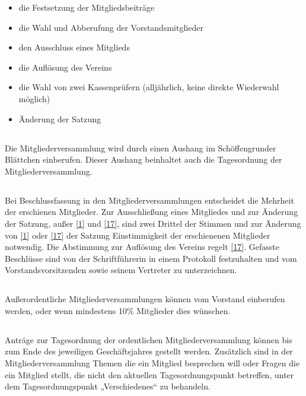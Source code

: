 	\begin{itemize}
		\item die Festsetzung der Mitgliedsbeiträge 
		\item die Wahl und Abberufung der Vorstandsmitglieder
		\item den Ausschluss eines Mitglieds
		\item die Auflösung des Vereins
		\item die Wahl von zwei Kassenprüfern (alljährlich, keine direkte Wiederwahl möglich)
		\item Änderung der Satzung  
	\end{itemize} 

	
	\subsection{} Die Mitgliederversammlung wird durch einen Aushang im Schöffengrunder Blättchen einberufen. Dieser Aushang beinhaltet auch die Tagesordnung der Mitgliederversammlung.  
	
	\subsection{} Bei Beschlussfassung in den Mitgliederversammlungen entscheidet die Mehrheit der erschienen Mitglieder. Zur Ausschließung eines Mitgliedes und zur Änderung der Satzung, außer \ref{1} und \ref{17}, sind zwei Drittel der Stimmen und zur Änderung von \ref{1} oder \ref{17} der Satzung Einstimmigkeit der erschienenen Mitglieder notwendig. Die Abstimmung zur Auflösung des Vereins regelt \ref{17}. Gefasste Beschlüsse sind von der Schriftführerin in einem Protokoll festzuhalten und vom Vorstandsvorsitzenden sowie seinem Vertreter zu unterzeichnen.  
	
	\subsection{} Außerordentliche Mitgliederversammlungen können vom Vorstand einberufen werden, oder wenn mindestens 10\% Mitglieder dies wünschen. 
	
	\subsection{} Anträge zur Tagesordnung der ordentlichen Mitgliederversammlung können  
	bis zum Ende des jeweiligen Geschäftsjahres gestellt werden. Zusätzlich sind in der Mitgliederversammlung Themen die ein Mitglied besprechen will oder Fragen die ein Mitglied stellt, die nicht den aktuellen Tagesordnungspunkt betreffen, unter dem Tagesordnungspunkt „Verschiedenes“ zu behandeln.

